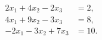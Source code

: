 \documentclass[preview]{standalone}
\begin{document}
\begin{align*}
2x_1 + 4x_2 - 2x_3 &= 2,\\
            4x_1 + 9x_2 - 3x_3 &= 8,\\
            -2x_1 - 3x_2 + 7x_3 &= 10.
\end{align*}
\end{document}
